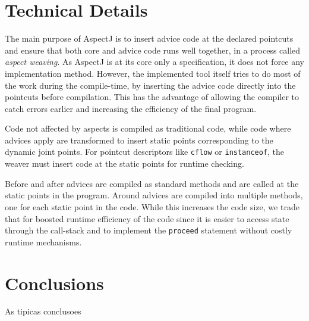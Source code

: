 \documentclass{template}
\begin{document}


\section{Technical Details}

The main purpose of AspectJ is to insert advice code at the declared pointcuts and ensure that
both core and advice code runs well together, in a process called \emph{aspect weaving}.
As AspectJ is at its core only a specification, it does not force any implementation method.
However, the implemented tool itself tries to do most of the work during the compile-time, by
inserting the advice code directly into the pointcuts before compilation. This has the advantage of
allowing the compiler to catch errors earlier and increasing the efficiency of the final program.

Code not affected by aspects is compiled as traditional code, while code where advices apply are
transformed to insert static points corresponding to the dynamic joint points.
For pointcut descriptors like \texttt{cflow} or \texttt{instanceof}, the weaver must insert
code at the static points for runtime checking.

Before and after advices are compiled as standard methods and are called at the static points in
the program. Around advices are compiled into multiple methods, one for each static point in the code.
While this increases the code size, we trade that for boosted runtime efficiency of the code since
it is easier to access state through the call-stack and to implement the \texttt{proceed} statement
without costly runtime mechanisms.

\section{Conclusions}

As tipicas conclusoes \cite{Kiczales97aspect-orientedprogramming}




\balancecolumns
\end{document}
